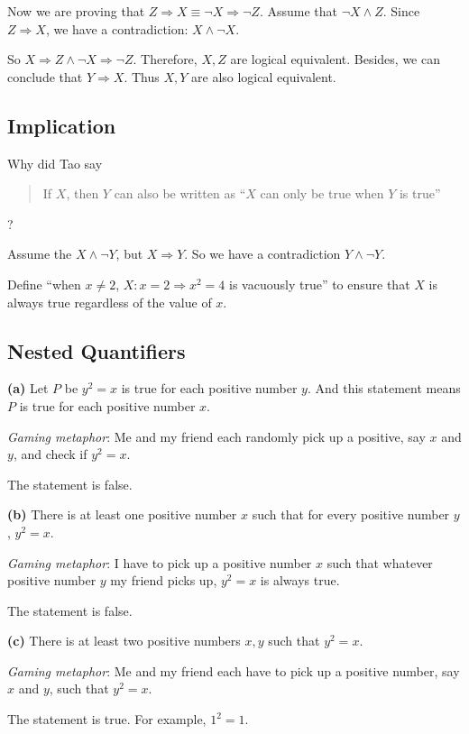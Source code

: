 Now we are proving that 
$Z \Longrightarrow X \equiv \neg X \Longrightarrow \neg Z$. Assume that $\neg X \wedge Z$. Since 
$Z \Longrightarrow X$, we have a contradiction: $X \wedge \neg X$.

So $X \Longrightarrow Z \wedge \neg X \Longrightarrow \neg Z$. Therefore, $X,Z$ are logical equivalent. 
Besides, we can conclude that $Y \Longrightarrow X$. Thus $X,Y$ are also logical equivalent.

\subsection{Implication}
Why did Tao say
\begin{quotation}
If $X$, then $Y$ can also be written as ``$X$ can only be true when $Y$ is true''
\end{quotation}?

Assume the $X \wedge \neg Y$, but $X \Longrightarrow Y$. So we have a contradiction 
$Y \wedge \neg Y$.

Define ``when $x \neq 2$, $X:x=2 \Longrightarrow x^2=4$ is vacuously true'' to ensure that $X$ is 
always true regardless of the value of $x$.

\subsection{Nested Quantifiers}
\textbf{(a)} Let $P$ be $y^2=x$ is true for each positive number $y$. And this statement means $P$ is 
true for each positive number $x$. 

\emph{Gaming metaphor}: Me and my friend each randomly pick up a positive, say $x$ and $y$, and check 
if $y^2=x$.

The statement is false.

\textbf{(b)} There is at least one positive number $x$ such that for every positive number $y$, 
$y^2=x$.

\emph{Gaming metaphor}: I have to pick up a positive number $x$ such that whatever positive number $y$ 
my friend picks up, $y^2=x$ is always true.

The statement is false.

\textbf{(c)} There is at least two positive numbers $x,y$ such that $y^2=x$.

\emph{Gaming metaphor}: Me and my friend each have to pick up a positive number, say $x$ and $y$, such 
that $y^2=x$.

The statement is true. For example, $1^2=1$.

